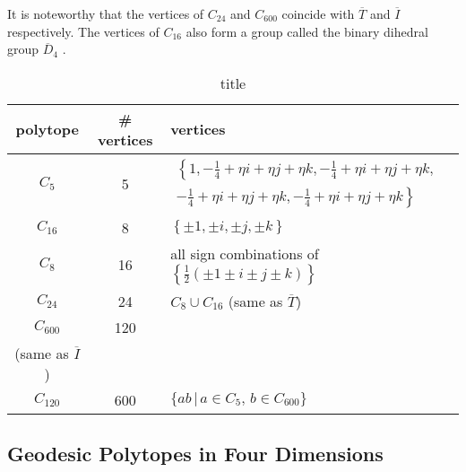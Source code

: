It is noteworthy that the vertices of $C_{24}$ and  $C_{600}$ coincide with $\overline{T}$ and $\overline{I}$ respectively. The vertices of $C_{16}$ also form a group called the binary dihedral group $\overline{D}_4$ \cite{findsource}.

\begin{table}
 \centering
 \begin{tabular}{c|c|l}
  polytope  & \# vertices & vertices                                                                                                                                    \\
  \hline
  $C_5$     & 5           & $\begin{array}{l}
    \left\{ 1,  -\frac{1}{4} + \eta i + \eta j + \eta k,  -\frac{1}{4} + \eta i + \eta j  + \eta k, \right. \\
    \left.  -\frac{1}{4} + \eta i + \eta j + \eta k, -\frac{1}{4} + \eta i + \eta j + \eta k \right\}
   \end{array}$                                                                                                                 \\
  \hline
  $C_{16}$  & 8           & $\left\{ \pm 1, \pm i, \pm j, \pm k \right\}$                                                                                               \\
  \hline
  $C_8$     & 16          & all sign combinations of $ \left\{  \frac{1}{2} (\pm 1 \pm i \pm j \pm k)\right\}$                                                          \\
  \hline
  $C_{24}$  & 24          & $C_8 \cup C_{16}$ (same as $\overline{T}$)                                                                                                  \\
  \hline
  $C_{600}$ & 120         & \makecell[l]{ $ C_{24} \cup \left\{  \textrm{sign comb. and even perm. of } \frac{1}{2} \left(1+\tau i + \frac{j}{\tau} \right)  \right\} $ \\ (same as $\overline{I}$)} \\
  \hline
  $C_{120}$ & 600         & $\{a b \, | \, a \in C_5, \, b \in C_{600} \}$                                                                                              \\
 \end{tabular}
 \caption{title}
 \label{tab:polytopes}
\end{table}

\subsection{Geodesic Polytopes in Four Dimensions}

